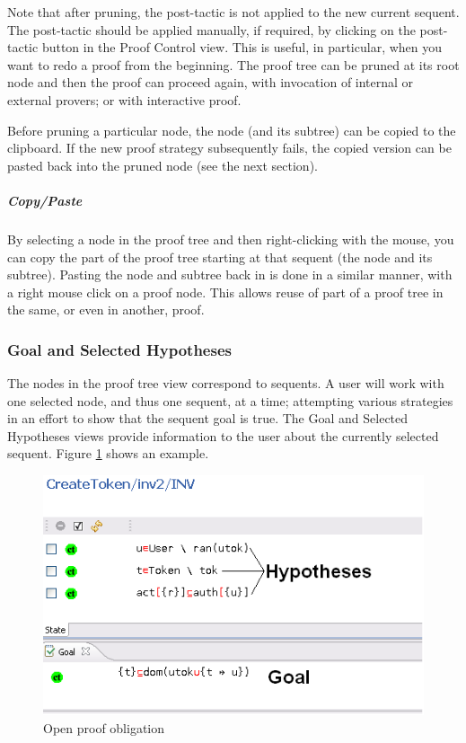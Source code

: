 Note that after pruning, the post-tactic is not applied to the new current sequent. The post-tactic should be applied manually, if required, by clicking on the post-tactic button in the Proof Control view. This is useful, in particular, when you want to redo a proof from the beginning. The proof tree can be pruned at its root node and then the proof can proceed again, with invocation of internal or external provers; or with interactive proof.

Before pruning a particular node, the node (and its subtree) can be copied to the clipboard. If the new proof strategy subsequently fails, the copied version can be pasted back into the pruned node (see the next section). 

\subparagraph{Copy/Paste}

By selecting a node in the proof tree and then right-clicking with the mouse, you can copy the part of the proof tree starting at that sequent (the node and its subtree). Pasting the node and subtree back in is done in a similar manner, with a right mouse click on a proof node. This allows reuse of part of a proof tree in the same, or even in another, proof.

\subsubsection{Goal and Selected Hypotheses}

The nodes in the proof tree view correspond to sequents. A user will work with one selected node, and thus one sequent, at a time; attempting various strategies in an effort to show that the sequent goal is true. The \textsf{Goal} and \textsf{Selected Hypotheses} views provide information to the user about the currently selected sequent. Figure \ref{fig_ref_01_proving_perspective3} shows an example.

\begin{figure}[!h]
\begin{center}
	\includegraphics{img/reference/ref_01_proving_perspective3.png}
	\caption{Open proof obligation}
	\label{fig_ref_01_proving_perspective3}
\end{center}
\end{figure}

